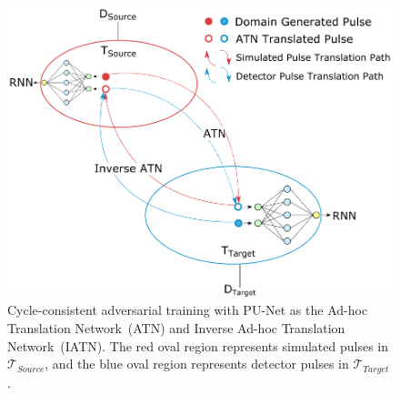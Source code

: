 \begin{figure}[htb!]
    \includegraphics[width=0.99\linewidth]{ch6/figs/cycgan.png}
    \caption{Cycle-consistent adversarial training with PU-Net as the Ad-hoc Translation Network~(ATN) and Inverse Ad-hoc Translation Network~(IATN). The red oval region represents simulated pulses in $\mathcal{T}_{Source}$, and the blue oval region represents detector pulses in $\mathcal{T}_{Target}$.}
   \label{fig:network training}
\end{figure}
